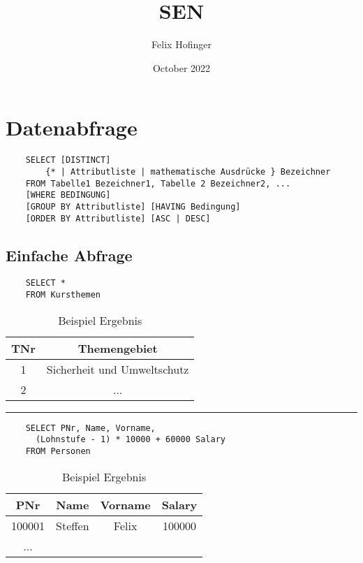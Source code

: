 \documentclass{article}
\title{SEN}
\author{Felix Hofinger}
\date{October 2022}
\begin{document}
\maketitle
\newpage
\tableofcontents
\newpage

\section{Datenabfrage}

\begin{verbatim}
    SELECT [DISTINCT] 
        {* | Attributliste | mathematische Ausdrücke } Bezeichner
    FROM Tabelle1 Bezeichner1, Tabelle 2 Bezeichner2, ...
    [WHERE BEDINGUNG]
    [GROUP BY Attributliste] [HAVING Bedingung]
    [ORDER BY Attributliste] [ASC | DESC]
\end{verbatim}

\subsection{Einfache Abfrage}

\begin{verbatim}
    SELECT *
    FROM Kursthemen
\end{verbatim}

\begin{table}[!htbp]
  \center
  \begin{tabular}{c|c}
    TNr & Themengebiet                \\
    \hline
    1   & Sicherheit und Umweltschutz \\
    2   & ...
  \end{tabular}
  \label{tab:select:1}
  \caption{Beispiel Ergebnis}
\end{table}

\hrule

\begin{verbatim}
    SELECT PNr, Name, Vorname, 
      (Lohnstufe - 1) * 10000 + 60000 Salary
    FROM Personen
\end{verbatim}

\begin{table}[!htbp]
  \center
  \begin{tabular}{c|c|c|c}
    PNr    & Name    & Vorname & Salary \\
    \hline
    100001 & Steffen & Felix   & 100000 \\
    ...    &         &         &
  \end{tabular}
  \label{tab:select:2}
  \caption{Beispiel Ergebnis}
\end{table}
\end{document}
